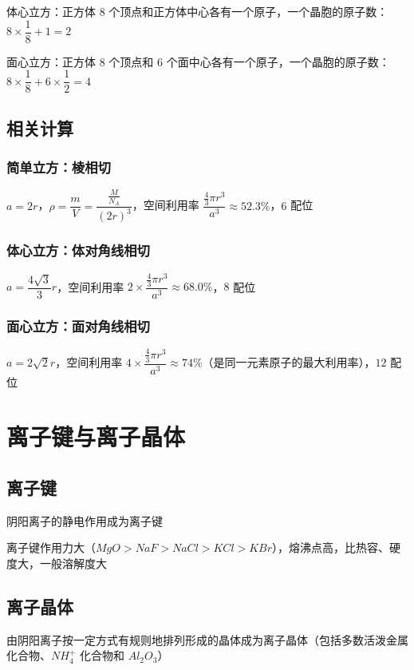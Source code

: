 \documentclass[UTF8,zihao=-4,openany]{ctexbook}
\begin{document}
体心立方：正方体 $8$ 个顶点和正方体中心各有一个原子，一个晶胞的原子数：$8\times \dfrac{1}{8}+1=2$\par

面心立方：正方体 $8$ 个顶点和 $6$ 个面中心各有一个原子，一个晶胞的原子数：$8\times \dfrac{1}{8}+6\times \dfrac{1}{2}=4$\par
\subsection{相关计算}
\subsubsection{简单立方：棱相切}
$a=2r$，$\rho=\dfrac{m}{V}=\dfrac{\frac{M}{N_A}}{(2r)^3}$，空间利用率 $\dfrac{\frac{4}{3}\pi r^3}{a^3}\approx52.3\%$，$6$ 配位\par

\subsubsection{体心立方：体对角线相切}
$a=\dfrac{4\sqrt{3}}{3}r$，空间利用率 $2\times \dfrac{\frac{4}{3}\pi r^3}{a^3}\approx68.0\%$，$8$ 配位\par

\subsubsection{面心立方：面对角线相切}
$a=2\sqrt{2}r$，空间利用率 $4\times \dfrac{\frac{4}{3}\pi r^3}{a^3}\approx74\%$（是同一元素原子的最大利用率），$12$ 配位\par
\section{离子键与离子晶体}
\subsection{离子键}
阴阳离子的静电作用成为离子键\par

离子键作用力大（$MgO>NaF>NaCl>KCl>KBr$），熔沸点高，比热容、硬度大，一般溶解度大\par
\subsection{离子晶体}
由阴阳离子按一定方式有规则地排列形成的晶体成为离子晶体（包括多数活泼金属化合物、$NH_4^+$ 化合物和 $Al_2O_3$）\par
\end{document}

